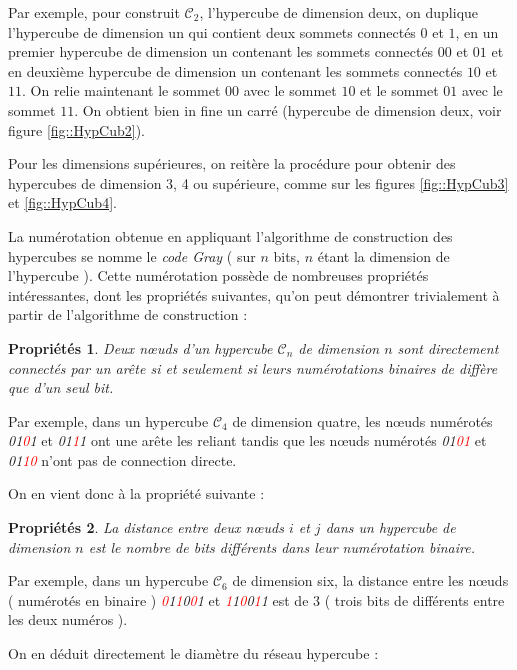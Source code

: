 \documentclass[fleqn,11pt]{article}
\newtheorem{prop}{Propriétés}
\begin{document}
Par exemple, pour construit $\mathcal{C}_{2}$, l'hypercube de dimension deux,
on duplique l'hypercube de dimension un qui contient
deux sommets connectés $0$ et $1$, en un premier hypercube de dimension un contenant les sommets
connectés $00$ et $01$ et en deuxième hypercube de dimension un contenant les sommets connectés $10$ et $11$.
On relie maintenant le sommet $00$ avec le sommet $10$ et le sommet $01$ avec le sommet $11$. On
obtient bien in fine un carré (hypercube de dimension deux, voir figure \ref{fig::HypCub2}).

Pour les dimensions supérieures, on reitère la procédure pour obtenir des hypercubes de dimension
3, 4 ou supérieure, comme sur les figures \ref{fig::HypCub3} et \ref{fig::HypCub4}.

La numérotation obtenue en appliquant l'algorithme de construction des hypercubes se nomme le \textsl{code Gray} ( sur $n$
bits, $n$ étant la dimension de l'hypercube ). Cette numérotation possède de nombreuses propriétés
intéressantes, dont les propriétés suivantes, qu'on peut démontrer trivialement à partir de l'algorithme de construction :

\begin{prop}
Deux n{\oe}uds d'un hypercube $\mathcal{C}_{n}$ de dimension $n$ sont directement connectés par un arête si et seulement
si leurs numérotations binaires de diffère que d'un seul bit. 
\end{prop}

Par exemple, dans un hypercube $\mathcal{C}_{4}$ de dimension quatre, les n{\oe}uds numérotés
\textsl{01\textcolor{red}{0}1} et \textsl{01\textcolor{red}{1}1} ont une arête les reliant
tandis que les n{\oe}uds numérotés \textsl{01\textcolor{red}{01}} et \textsl{01\textcolor{red}{10}}
n'ont pas de connection directe.

On en vient donc à la propriété suivante :

\begin{prop}
La distance entre deux nœuds $i$ et $j$ dans un hypercube de dimension $n$ est le nombre de bits différents
dans leur numérotation binaire.
\end{prop}

Par exemple, dans un hypercube $\mathcal{C}_{6}$ de dimension six, la distance entre les nœuds ( numérotés en binaire ) 
\textsl{\textcolor{red}{0}1\textcolor{red}{1}0\textcolor{red}{0}1} et 
\textsl{\textcolor{red}{1}1\textcolor{red}{0}0\textcolor{red}{1}1} est de 3 ( trois bits
de différents entre les deux numéros ).

On en déduit directement le diamètre du réseau hypercube :
\end{document}
